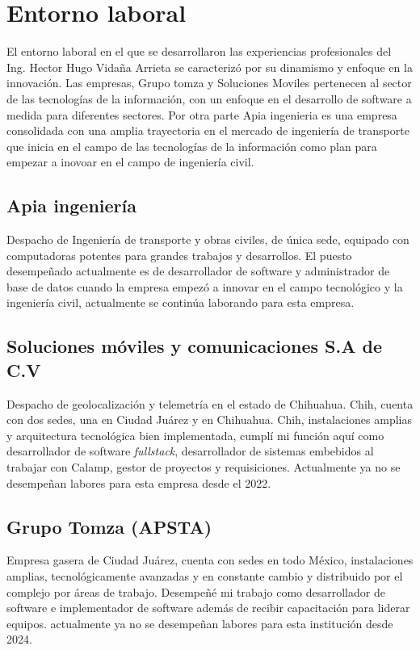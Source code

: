 \documentclass[protocolo.tex]{subfiles}
\begin{document}
\section{Entorno laboral}

El entorno laboral en el que se desarrollaron las experiencias profesionales del Ing. Hector Hugo Vidaña Arrieta se caracterizó por su dinamismo y enfoque en la innovación. Las empresas, Grupo tomza y Soluciones Moviles pertenecen al sector de las tecnologías de la información, con un enfoque en el desarrollo de software a medida para diferentes sectores. Por otra parte Apia ingenieria es una empresa consolidada con una amplia trayectoria en el mercado de ingeniería de transporte que inicia en el campo de las tecnologías de la información como plan para empezar a inovoar en el campo de ingeniería civil.

\subsection{Apia ingeniería}
Despacho de Ingeniería de transporte y obras civiles, de única sede, equipado con computadoras potentes para grandes trabajos y desarrollos. El puesto desempeñado actualmente es de desarrollador de software y administrador de base de datos cuando la empresa empezó a innovar en el campo tecnológico y la ingeniería civil, actualmente se continúa laborando para esta empresa.

\subsection{Soluciones móviles y comunicaciones S.A de C.V}
Despacho de geolocalización y telemetría en el estado de Chihuahua. Chih, cuenta con dos sedes, una en Ciudad Juárez y en Chihuahua. Chih, instalaciones amplias y arquitectura tecnológica bien implementada, cumplí mi función aquí como desarrollador de software \textit{fullstack}, desarrollador de sistemas embebidos al trabajar con Calamp, gestor de proyectos y requisiciones. Actualmente ya no se desempeñan labores para esta empresa desde el 2022.

\subsection{Grupo Tomza (APSTA)}
Empresa gasera de Ciudad Juárez, cuenta con sedes en todo México, instalaciones amplias, tecnológicamente avanzadas y en constante cambio y distribuido por el complejo por áreas de trabajo. Desempeñé mi trabajo como desarrollador de software e implementador de software además de recibir capacitación para liderar equipos. actualmente ya no se desempeñan labores para esta institución desde 2024.
\end{document}
